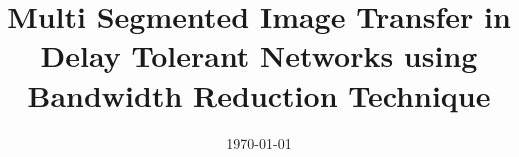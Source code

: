 \documentclass[a4paper, 12pt, twoside]{synopsis}  %
\begin{document}
\title  {Multi Segmented Image Transfer in Delay Tolerant Networks using Bandwidth Reduction Technique}
\addresses  {\groupname\\\deptname\\\univname}  %
\date       {\today}
\subject    {}
\keywords   {}

\maketitle



\pagestyle{plain}  %

\setlength\parindent{20pt}

\end{document}
